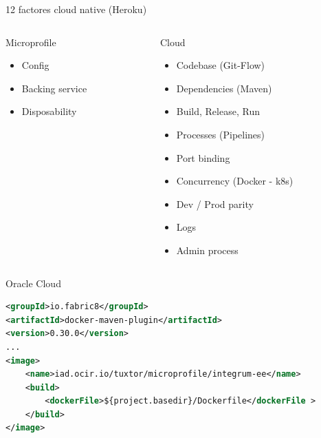 \documentclass{beamer}
\begin{document}
\begin{frame}{12 factores cloud native (Heroku)}

\begin{columns}[T] %
	
	\begin{column}[T]{4cm} %
		\begin{alertblock}{Microprofile}
	\begin{itemize}
		\item Config
		\item Backing service
		\item Disposability
	\end{itemize}
\end{alertblock}
	\end{column}
	\begin{column}[T]{6cm} %
		\begin{block}{Cloud}
	\begin{itemize}
	\item Codebase (Git-Flow)
	\item Dependencies (Maven)
	\item Build, Release, Run
	\item Processes (Pipelines)
	\item Port binding
	\item Concurrency (Docker - k8s)
	\item Dev / Prod parity
	\item Logs
	\item Admin process
\end{itemize}
\end{block}
	\end{column}
\end{columns}

\end{frame}

\begin{frame}[fragile]{Oracle Cloud}
\begin{lstlisting}[language=XML, basicstyle=\scriptsize]
<groupId>io.fabric8</groupId>
<artifactId>docker-maven-plugin</artifactId>
<version>0.30.0</version>
...
<image>
	<name>iad.ocir.io/tuxtor/microprofile/integrum-ee</name>
	<build>
		<dockerFile>${project.basedir}/Dockerfile</dockerFile >
	</build>
</image>
\end{lstlisting}
\end{frame}
\end{document}
